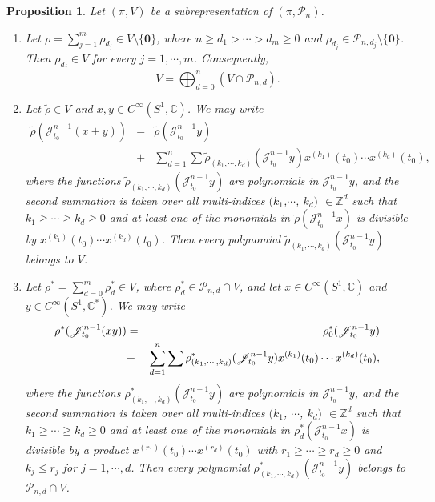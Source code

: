 \documentclass[11pt]{amsart}
\numberwithin{equation}{section}
\newtheorem{prop}[thm]{Proposition}
\newcommand{\bz}{\mathbb{Z}}
\newcommand{\scp}{\mathscr{P}}
\newcommand{\sjm}{\mathscr{J}^{n-1}_{t_0}}
\newcommand{\sjmx}{\mathscr{J}^{n-1}_{t_0} x}
\newcommand{\sjmy}{\mathscr{J}^{n-1}_{t_0} y}
\newcommand{\cisoc}{C^{\infty}\left(S^1, \mathbb{C} \right)}
\newcommand{\cisoca}{C^{\infty}\left(S^1, \mathbb{C}^{\ast} \right)}
\newcommand{\pn}{\mathscr{P}_{n}}
\newcommand{\pnd}{\mathscr{P}_{n, d}}
\begin{document}
\begin{prop}  \label{prepare}
  Let $(\pi, V)$ be a subrepresentation of $(\pi, \pn)$.
\begin{enumerate}
  \item[(a)]
  Let
  $\rho=\sum_{j=1}^m \rho_{d_j} \in V \setminus \{\mathbf{0}\}$,
  where $n \ge d_1>\cdots >d_m \ge 0$ and
  $\rho_{d_j} \in \scp_{n, d_j} \setminus \{\mathbf{0}\}$.
  Then $\rho_{d_j} \in V$ for every $j=1,\cdots,m$. Consequently,
  \begin{equation*}
    V=\bigoplus_{d=0}^{n} (V \cap \pnd).
  \end{equation*}

  \item[(b)]
  Let $\tilde{\rho} \in V$ and $x, y \in \cisoc$. We may write
  \begin{eqnarray*}
    \tilde{\rho}(\sjm (x+y))
    &=& \tilde{\rho}(\sjmy) \\
    &+& \sum_{d=1}^n \sum
    \tilde{\rho}_{(k_1, \cdots, k_d)}(\sjm y)
    x^{(k_1)}(t_0) \cdots x^{(k_d)}(t_0),
  \end{eqnarray*}
  where the functions $\tilde{\rho}_{(k_1, \cdots, k_d)}(\sjm y)$ are polynomials in
  $\sjm y$, and the second summation is taken over all multi-indices
  $(k_1$,$\cdots$, $k_d)$ $\in \bz^d$
  such that
  $k_1 \ge \cdots \ge k_d \ge 0$ and at least one of the monomials in
  $\tilde{\rho}(\sjmx)$ is divisible by
  $x^{(k_1)}(t_0) \cdots x^{(k_d)}(t_0)$.
  Then every polynomial $\tilde{\rho}_{(k_1, \cdots, k_d)}(\sjm y)$ belongs to $V$.

  \item[(c)]
  Let
  $\rho^{\ast}=\sum_{d=0}^m \rho^{\ast}_{d} \in V$,
  where $\rho^{\ast}_d \in \pnd \cap V$, and let $x \in \cisoc$ and
  $y \in \cisoca$. We may write
  \begin{eqnarray*}
    \rho^{\ast}(\sjm (xy))
    &=& \rho^{\ast}_0(\sjmy) \notag \\
    &+& \sum_{d=1}^n \sum
    \rho^{\ast}_{(k_1,\cdots,k_d)}(\sjm y)
    x^{(k_1)}(t_0) \cdots x^{(k_d)}(t_0), \label{xy}
  \end{eqnarray*}
  where the functions $\rho^{\ast}_{(k_1,\cdots,k_d)}(\sjm y)$ are polynomials
  in $\sjm y$, and the second summation is taken over all multi-indices
  $(k_1$, $\cdots$, $k_d)$ $\in \bz^d$ such that
  $k_1 \ge \cdots \ge k_d \ge 0$ and at least one of the monomials in
  $\rho^{\ast}_d(\sjmx)$ is divisible by a product
  $x^{(r_1)}(t_0) \cdots x^{(r_d)}(t_0)$ with $r_1 \ge \cdots \ge r_d \ge 0$ and
  $k_j \le r_j$ for $j=1,\cdots,d$.
  Then every polynomial $\rho^{\ast}_{(k_1,\cdots,k_d)}(\sjm y)$ belongs to
  $\pnd \cap V$.
\end{enumerate}
\end{prop}
\end{document}
